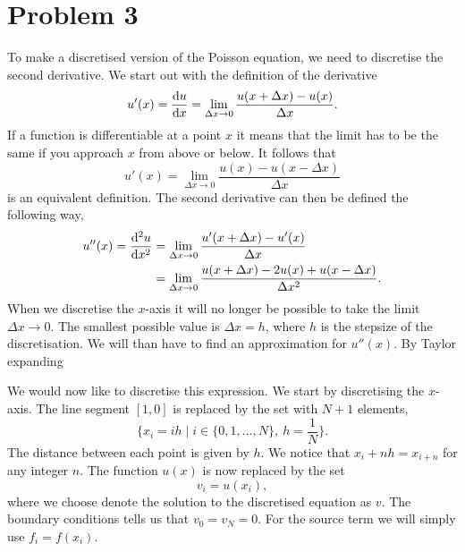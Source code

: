 \documentclass[english,notitlepage,aps,pra,10pt]{revtex4-2}
\begin{document}
\section*{Problem 3}

To make a discretised version of the Poisson equation, we need to discretise the second derivative. We start out with the definition of the derivative
\begin{equation}
    u'(x) = \dv{u}{x} = \lim_{\Delta x \to 0} \frac{u(x+\Delta x) - u(x)}{\Delta x}.
\end{equation}
If a function is differentiable at a point $x$ it means that the limit has to be the same if you approach $x$ from above or below. It follows that 
\begin{equation}
    u'(x) = \lim_{\Delta x \to 0} \frac{u(x) - u(x-\Delta x)}{\Delta x}
\end{equation}
is an equivalent definition. The second derivative can then be defined the following way,
\begin{equation}
    \begin{split}
        u''(x) = \dv[2]{u}{x} &= \lim_{\Delta x \to 0} \frac{u'(x+\Delta x) - u'(x)}{\Delta x} \\
            &= \lim_{\Delta x \to 0} \frac{u(x+\Delta x) - 2u(x) + u(x-\Delta x)}{\Delta x^2}.
    \end{split}
    \label{eq:secDer}
\end{equation}
When we discretise the $x$-axis it will no longer be possible to take the limit $\Delta x \to 0$. The smallest possible value is $\Delta x = h$, where $h$ is the stepsize of the discretisation. We will than have to find an approximation for $u''(x)$. By Taylor expanding 

We would now like to discretise this expression. We start by discretising the $x$-axis. The line segment $[1,0]$ is replaced by the set with $N+1$ elements, 
\begin{equation}
    \{x_i = i h \mid i\in\{0,1, \dots, N\},\ h = \frac{1}{N}\}.
\end{equation}
The distance between each point is given by $h$. We notice that $x_i + nh = x_{i+n}$ for any integer $n$. The function $u(x)$ is now replaced by the set
\begin{equation}
    v_i = u(x_i),
\end{equation}
where we choose denote the solution to the discretised equation as $v$. The boundary conditions tells us that $v_0 = v_N = 0$. For the source term we will simply use $f_i = f(x_i)$. 
\end{document}
